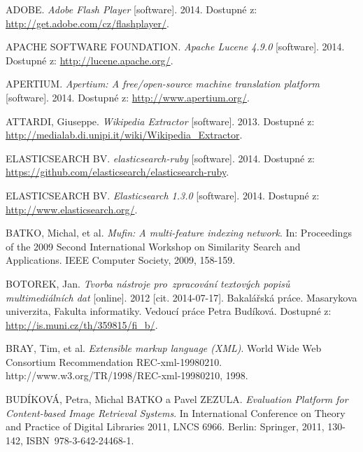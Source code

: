 
\def\bibname{Seznam použité literatury}


\begin{thebibliography}{99}
\addcontentsline{toc}{chapter}{\bibname}


  ADOBE. \textit{Adobe Flash Player} [software]. 2014.
  Dostupné z: \url{http://get.adobe.com/cz/flashplayer/}.

  APACHE SOFTWARE FOUNDATION. \textit{Apache Lucene 4.9.0} [software]. 2014.
  Dostupné z: \url{http://lucene.apache.org/}.

  APERTIUM. \textit{Apertium: A free/open-source machine translation platform} [software]. 2014.
  Dostupné z: \url{http://www.apertium.org/}.

  ATTARDI, Giuseppe. \textit{Wikipedia Extractor} [software]. 2013.
  Dostupné z: \url{http://medialab.di.unipi.it/wiki/Wikipedia_Extractor}.

  ELASTICSEARCH BV. \textit{elasticsearch-ruby} [software]. 2014.
  Dostupné z: \url{https://github.com/elasticsearch/elasticsearch-ruby}.

  ELASTICSEARCH BV. \textit{Elasticsearch 1.3.0} [software]. 2014.
  Dostupné z: \url{http://www.elasticsearch.org/}.

  BATKO, Michal, et al. \textit{Mufin: A multi-feature indexing network}. In: Proceedings of the 2009 Second International Workshop on Similarity Search and Applications. IEEE Computer Society, 2009, 158-159.

  BOTOREK, Jan. \textit{Tvorba nástroje pro~zpracování textových popisů multimediálních dat} [online]. 2012 [cit. 2014-07-17]. Bakalářská práce. Masarykova univerzita, Fakulta informatiky. Vedoucí práce Petra Budíková. Dostupné z: \url{http://is.muni.cz/th/359815/fi_b/}.

  BRAY, Tim, et al. \textit{Extensible markup language (XML)}. World Wide Web Consortium Recommendation REC-xml-19980210. http://www.w3.org/TR/1998/REC-xml-19980210, 1998.

  BUDÍKOVÁ, Petra, Michal BATKO a Pavel ZEZULA. \textit{Evaluation Platform for Content-based Image Retrieval Systems}. In International Conference on Theory and Practice of Digital Libraries 2011, LNCS 6966. Berlin: Springer, 2011, 130-142, ISBN~978-3-642-24468-1.


\end{thebibliography}
